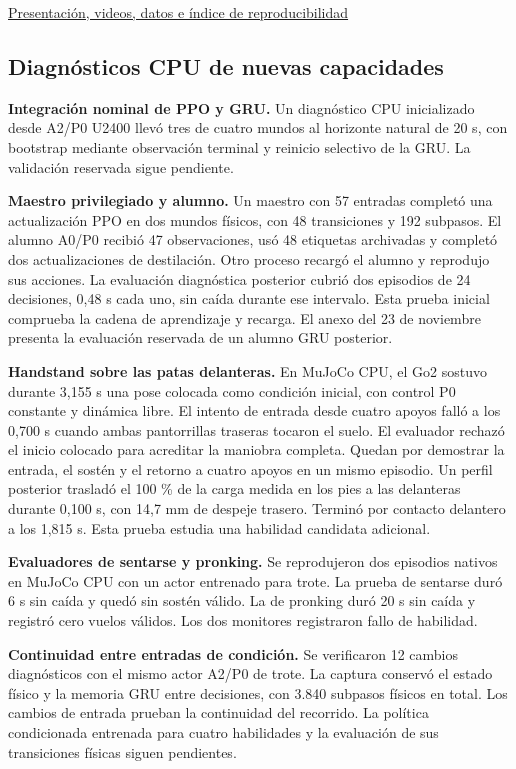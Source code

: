 \documentclass[11pt]{article}
\begin{document}
\href{\repo/tree/main/docs/academico}{Presentación, videos, datos e índice de reproducibilidad}

\newpage
\subsection*{Diagnósticos CPU de nuevas capacidades}
\noindent\textbf{Integración nominal de PPO y GRU.} Un diagnóstico CPU inicializado desde A2/P0 U2400 llevó tres de cuatro mundos al horizonte natural de 20 s, con bootstrap mediante observación terminal y reinicio selectivo de la GRU. La validación reservada sigue pendiente.


\textbf{Maestro privilegiado y alumno.} Un maestro con 57 entradas completó una actualización PPO en dos mundos físicos, con 48 transiciones y 192 subpasos. El alumno A0/P0 recibió 47 observaciones, usó 48 etiquetas archivadas y completó dos actualizaciones de destilación. Otro proceso recargó el alumno y reprodujo sus acciones. La evaluación diagnóstica posterior cubrió dos episodios de 24 decisiones, 0,48 s cada uno, sin caída durante ese intervalo. Esta prueba inicial comprueba la cadena de aprendizaje y recarga. El anexo del 23 de noviembre presenta la evaluación reservada de un alumno GRU posterior.

\medskip
\textbf{Handstand sobre las patas delanteras.} En MuJoCo CPU, el Go2 sostuvo durante 3,155 s una pose colocada como condición inicial, con control P0 constante y dinámica libre. El intento de entrada desde cuatro apoyos falló a los 0,700 s cuando ambas pantorrillas traseras tocaron el suelo. El evaluador rechazó el inicio colocado para acreditar la maniobra completa. Quedan por demostrar la entrada, el sostén y el retorno a cuatro apoyos en un mismo episodio. Un perfil posterior trasladó el 100 \% de la carga medida en los pies a las delanteras durante 0,100 s, con 14,7 mm de despeje trasero. Terminó por contacto delantero a los 1,815 s. Esta prueba estudia una habilidad candidata adicional.

\medskip
\textbf{Evaluadores de sentarse y pronking.} Se reprodujeron dos episodios nativos en MuJoCo CPU con un actor entrenado para trote. La prueba de sentarse duró 6 s sin caída y quedó sin sostén válido. La de pronking duró 20 s sin caída y registró cero vuelos válidos. Los dos monitores registraron fallo de habilidad.

\medskip
\textbf{Continuidad entre entradas de condición.} Se verificaron 12 cambios diagnósticos con el mismo actor A2/P0 de trote. La captura conservó el estado físico y la memoria GRU entre decisiones, con 3.840 subpasos físicos en total. Los cambios de entrada prueban la continuidad del recorrido. La política condicionada entrenada para cuatro habilidades y la evaluación de sus transiciones físicas siguen pendientes.
\end{document}
